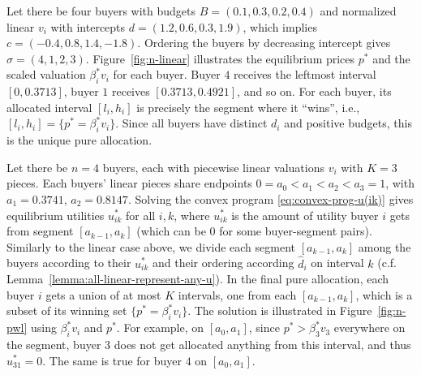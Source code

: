 \begin{example}
	[Linear $v_i$]
	\label{ex:linear-numerical}
	Let there be four buyers with budgets $B = (0.1, 0.3, 0.2, 0.4)$ and normalized linear $v_i$ with intercepts $d = (1.2, 0.6, 0.3, 1.9)$, which implies $c = (-0.4,  0.8,  1.4, -1.8)$. Ordering the buyers by decreasing intercept gives $\sigma = (4, 1, 2, 3)$. 
	Figure~\ref{fig:n-linear} illustrates the equilibrium prices $p^*$ and the scaled valuation $\beta^*_i v_i$ for each buyer. Buyer $4$ receives the leftmost interval $[0, 0.3713]$, buyer $1$ receives $[0.3713, 0.4921]$, and so on. 
	For each buyer, its allocated interval $[l_i,h_i]$ is precisely the segment where it ``wins'', i.e., $[l_i, h_i] = \{p^* = \beta^*_i v_i\}$. 
	Since all buyers have distinct $d_i$ and positive budgets, this is the unique pure allocation. 
\end{example}


\begin{example}
	 \label{ex:pwl-numerical}
	Let there be $n=4$ buyers, each with piecewise linear valuations $v_i$ with $K = 3$ pieces. Each buyers' linear pieces share endpoints $0 = a_0 < a_1 < a_2 < a_3 = 1$, with $a_1 = 0.3741$, $a_2 = 0.8147$. 
	Solving the convex program \eqref{eq:convex-prog-u(ik)} gives equilibrium utilities $u^*_{ik}$ for all $i,k$, where $u^*_{ik}$ is the amount of utility buyer $i$ gets from segment $[a_{k-1}, a_k]$ (which can be $0$ for some buyer-segment pairs). 
	Similarly to the linear case above, we divide each segment  $[a_{k-1}, a_k]$ among the buyers according to their $u^*_{ik}$ and their ordering according $\hat{d}_i$  on interval $k$ (c.f. Lemma~\ref{lemma:all-linear-represent-any-u}).
	In the final pure allocation, each buyer $i$ gets a union of at most $K$ intervals, one from each $[a_{k-1}, a_k]$, which is a subset of its winning set $\{p^* = \beta^*_i v_i\}$. 
	The solution is illustrated in Figure~\ref{fig:n-pwl} using $\beta^*_i v_i$ and $p^*$.
	For example, on $[a_0, a_1]$, since $p^* > \beta^*_3 v_3$ everywhere on the segment, buyer $3$ does not get allocated anything from this interval, and thus $u^*_{31} = 0$. The same is true for buyer $4$ on $[a_0, a_1]$. 
\end{example}

